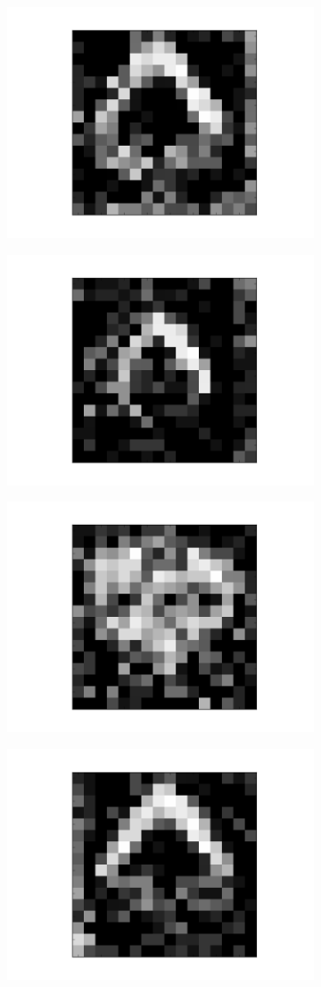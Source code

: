 \begin{figure}[h!]
	
	\begin{subfigure}{.25\textwidth}
  		\centering
  		\includegraphics[width=.6\linewidth]{imgs/poker/compl12.png}
  		\label{fig:sub1}
	\end{subfigure}%
	\begin{subfigure}{.25\textwidth}
  		\centering
  		\includegraphics[width=.6\linewidth]{imgs/poker/compl22.png}
  		\label{fig:sub1}
	\end{subfigure}%
	\begin{subfigure}{.25\textwidth}
  		\centering
  		\includegraphics[width=.6\linewidth]{imgs/poker/compl32.png}
  		\label{fig:sub1}
	\end{subfigure}%
	\begin{subfigure}{.25\textwidth}
  		\centering
  		\includegraphics[width=.6\linewidth]{imgs/poker/compl42.png}

\end{subfigure}
\end{figure}
